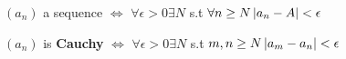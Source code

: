 \begin{define}
	$ (a_n) $ a sequence $ \iff $ $ \forall \epsilon>0 \exists N $ s.t $ \forall n \geq N    \left| a_n - A \right| < \epsilon  $
\end{define}

\begin{define}
	$ (a_n)  $ is \textbf{Cauchy} $ \iff $ $ \forall \epsilon > 0 \exists N $ s.t $ m,n \geq N \left| a_m - a_n \right| < \epsilon$
\end{define}